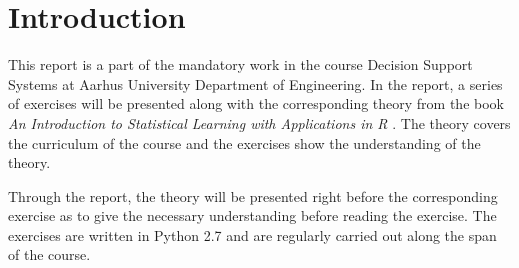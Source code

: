 \chapter{Introduction}
\label{chp:intro}

This report is a part of the mandatory work in the course Decision Support Systems at Aarhus University Department of Engineering.
In the report, a series of exercises will be presented along with the corresponding theory from the book \emph{An Introduction to Statistical Learning with Applications in R} \cite{ISLR}. 
The theory covers the curriculum of the course and the exercises show the understanding of the theory. 

Through the report, the theory will be presented right before the corresponding exercise as to give the necessary understanding before reading the exercise. The exercises are written in Python 2.7 and are regularly carried out along the span of the course. 